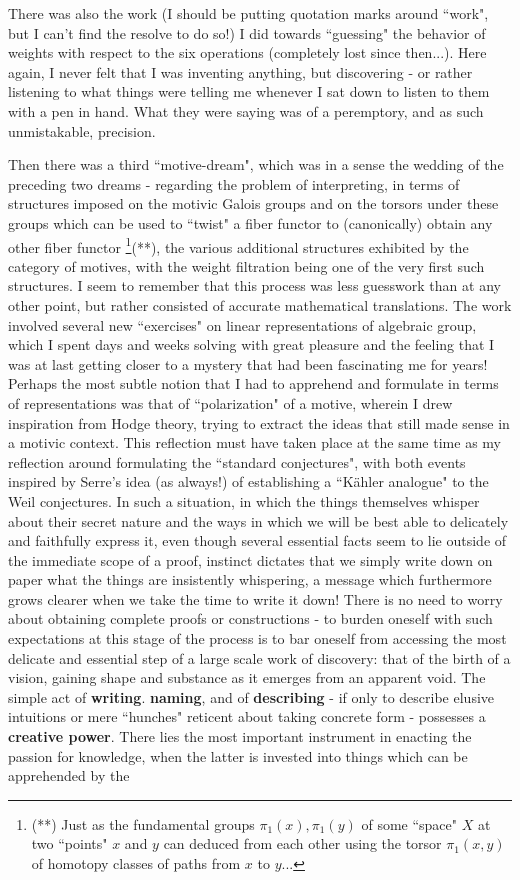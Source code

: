 There was also the work (I should be putting quotation marks around ``work", but I can't find the resolve to do so!) I did towards ``guessing" the behavior of weights with respect to the six operations (completely lost since then...). Here again, I never felt that I was inventing anything, but discovering - or rather listening to what things were telling me whenever I sat down to listen to them with a pen in hand. What they were saying was of a peremptory, and as such unmistakable, precision. 

Then there was a third ``motive-dream", which was in a sense the wedding of the preceding two dreams - regarding the problem of interpreting, in terms of structures imposed on the motivic Galois groups and on the torsors under these groups which can be used to ``twist" a fiber functor to (canonically) obtain any other fiber functor \footnote{(**) Just as the fundamental groups $\pi_1(x), \pi_1(y)$ of some ``space" $X$ at two ``points" $x$ and $y$ can deduced from each other using the torsor $\pi_1(x, y)$ of homotopy classes of paths from $x$ to $y$...}(**), the various additional structures exhibited by the category of motives, with the weight filtration being one of the very first such structures. I seem to remember that this process was less guesswork than at any other point, but rather consisted of accurate mathematical translations. The work involved several new ``exercises" on linear representations of algebraic group, which I spent days and weeks solving with great pleasure and the feeling that I was at last getting closer to a mystery that had been fascinating me for years! Perhaps the most subtle notion that I had to apprehend and formulate in terms of representations was that of ``polarization" of a motive, wherein I drew inspiration from Hodge theory, trying to extract the ideas that still made sense in a motivic context. This reflection must have taken place at the same time as my reflection around formulating the ``standard conjectures", with both events inspired by Serre's idea (as always!) of establishing a ``K\"ahler analogue" to the Weil conjectures. In such a situation, in which the things themselves whisper about their secret nature and the ways in which we will be best able to delicately and faithfully express it, even though several essential facts seem to lie outside of the immediate scope of a proof, instinct dictates that we simply write down on paper what the things are insistently whispering, a message which furthermore grows clearer when we take the time to write it down! There is no need to worry about obtaining complete proofs or constructions - to burden oneself with such expectations at this stage of the process is to bar oneself from accessing the most delicate and essential step of a large scale work of discovery: that of the birth of a vision, gaining shape and substance as it emerges from an apparent void. The simple act of \textbf{writing}. \textbf{naming}, and of \textbf{describing} - if only to describe elusive intuitions or mere ``hunches" reticent about taking concrete form - possesses a \textbf{creative power}. There lies the most important instrument in enacting the passion for knowledge, when the latter is invested into things which can be apprehended by the 